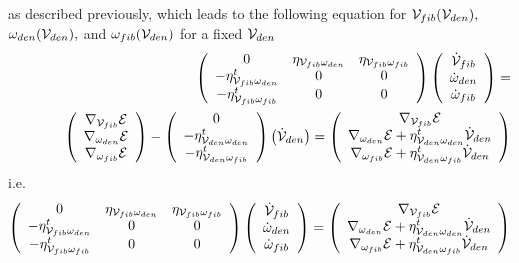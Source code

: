 as described previously, which leads to the following equation for ${\cal V}%
_{fib}({\cal V}_{den}),$ $\omega _{den}({\cal V}_{den}),$ and $\omega _{fib}(%
{\cal V}_{den})$ for a fixed ${\cal V}_{den}$ 
\begin{eqnarray}
&&\left( 
\begin{array}{ccc}
0 & \eta _{{\cal V}_{fib}\omega _{den}} & \eta _{{\cal V}_{fib}\omega _{fib}}
\\ 
-\eta _{{\cal V}_{fib}\omega _{den}}^{t} & 0 & 0 \\ 
-\eta _{{\cal V}_{fib}\omega _{fib}}^{t} & 0 & 0%
\end{array}%
\right) \left( 
\begin{array}{c}
{\cal \dot{V}}_{fib} \\ 
\dot{\omega}_{den} \\ 
\dot{\omega}_{fib}%
\end{array}%
\right) =  \nonumber \\
&&\qquad \quad \left( 
\begin{array}{c}
\nabla _{{\cal V}_{fib}}{\cal E} \\ 
\nabla _{\omega _{den}}{\cal E} \\ 
\nabla _{\omega _{fib}}{\cal E}%
\end{array}%
\right) -\left( 
\begin{array}{c}
0 \\ 
-\eta _{{\cal V}_{den}\omega _{den}}^{t} \\ 
-\eta _{{\cal V}_{den}\omega _{fib}}^{t}%
\end{array}%
\right) \left( {\cal \dot{V}}_{den}\right) =\left( 
\begin{array}{c}
\nabla _{{\cal V}_{fib}}{\cal E} \\ 
\nabla _{\omega _{den}}{\cal E}+\eta _{{\cal V}_{den}\omega _{den}}^{t}{\cal 
\dot{V}}_{den} \\ 
\nabla _{\omega _{fib}}{\cal E}+\eta _{{\cal V}_{den}\omega _{fib}}^{t}{\cal 
\dot{V}}_{den}%
\end{array}%
\right)  \label{feom}
\end{eqnarray}%
i.e. 
\begin{equation}
\left( 
\begin{array}{ccc}
0 & \eta _{{\cal V}_{fib}\omega _{den}} & \eta _{{\cal V}_{fib}\omega _{fib}}
\\ 
-\eta _{{\cal V}_{fib}\omega _{den}}^{t} & 0 & 0 \\ 
-\eta _{{\cal V}_{fib}\omega _{fib}}^{t} & 0 & 0%
\end{array}%
\right) \left( 
\begin{array}{c}
{\cal \dot{V}}_{fib} \\ 
\dot{\omega}_{den} \\ 
\dot{\omega}_{fib}%
\end{array}%
\right) =\left( 
\begin{array}{c}
\nabla _{{\cal V}_{fib}}{\cal E} \\ 
\nabla _{\omega _{den}}{\cal E}+\eta _{{\cal V}_{den}\omega _{den}}^{t}{\cal 
\dot{V}}_{den} \\ 
\nabla _{\omega _{fib}}{\cal E}+\eta _{{\cal V}_{den}\omega _{fib}}^{t}{\cal 
\dot{V}}_{den}%
\end{array}%
\right)
\end{equation}%

